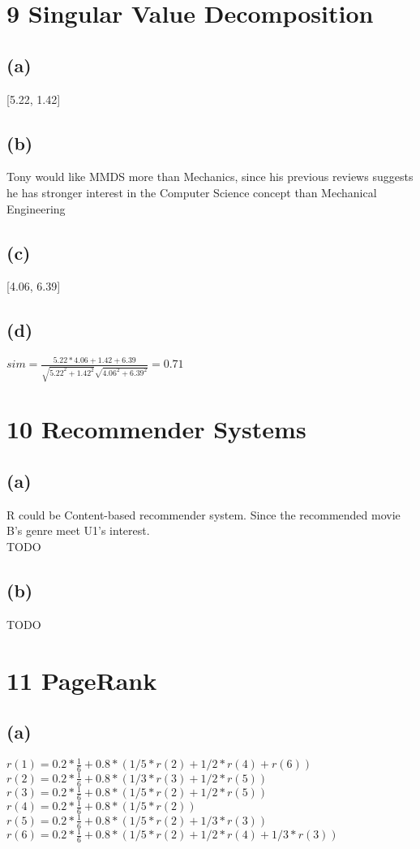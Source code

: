 \documentclass{article}
\begin{document}
\section{9 Singular Value Decomposition}
\subsection{(a)}
[5.22, 1.42]

\subsection{(b)}
Tony would like MMDS more than Mechanics, since his previous reviews suggests he has stronger interest in the Computer Science concept than Mechanical Engineering

\subsection{(c)}
[4.06, 6.39]

\subsection{(d)}
$sim = \frac{5.22*4.06 + 1.42 + 6.39}{\sqrt{5.22^2 + 1.42^2}\sqrt{4.06^2 + 6.39^2}} =
0.71 $

\section{10 Recommender Systems}
\subsection{(a)}
R could be Content-based recommender system. Since the recommended movie B's genre meet U1's interest.\\

TODO
\subsection{(b)}
TODO

\section{11 PageRank}
\subsection{(a)}
$r(1) = 0.2*\frac{1}{6} + 0.8* (1/5 * r(2) + 1/2 * r(4) + r(6))$ \\
$r(2) = 0.2*\frac{1}{6} + 0.8* (1/3 * r(3) + 1/2 * r(5) )$ \\
$r(3) = 0.2*\frac{1}{6} + 0.8* (1/5 * r(2) + 1/2 * r(5) )$ \\
$r(4) = 0.2*\frac{1}{6} + 0.8* (1/5 * r(2) )$ \\
$r(5) = 0.2*\frac{1}{6} + 0.8* (1/5 * r(2) + 1/3 * r(3) )$ \\
$r(6) = 0.2*\frac{1}{6} + 0.8* (1/5 * r(2) + 1/2 * r(4) + 1/3 * r(3) )$ \\
\end{document}

